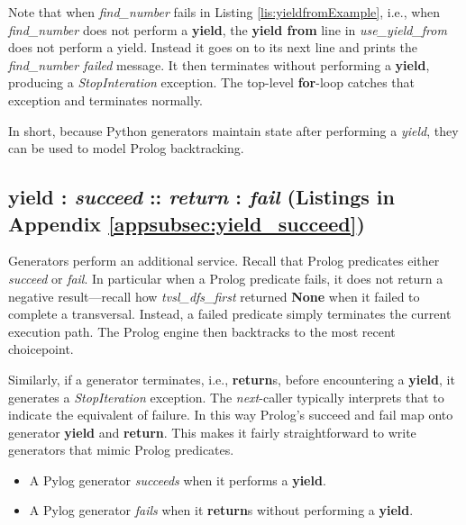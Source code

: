 
Note that when \textit{find\_number} fails in Listing \ref{lis:yieldfromExample}, i.e., when  \textit{find\_number} does not perform a \textbf{yield}, the \textbf{yield from} line in \textit{use\_yield\_from} does not perform a yield. Instead it goes on to its next line and prints the \textit{find\_number failed} message. It then terminates without performing a \textbf{yield}, producing a \textit{StopInteration} exception. The top-level \textbf{for}-loop catches that exception and terminates normally. 

In short, because Python generators maintain state after performing a \textit{yield}, they can be used to model Prolog backtracking.

\subsection{\textbf{yield} : \textit{succeed} :: \textit{return} : \textit{fail} (Listings in Appendix \ref{appsubsec:yield_succeed})} \label{subsec:yield_succeed}
Generators perform an additional service. Recall that Prolog predicates either \textit{succeed} or \textit{fail}. In particular when a Prolog predicate fails, it does not return a negative result---recall how \textit{tvsl\_dfs\_first} returned \textbf{None} when it failed to complete a transversal. Instead, a failed predicate simply terminates the current execution path. The Prolog engine then backtracks to the most recent choicepoint.

Similarly, if a generator terminates, i.e., \textbf{return}s, before encountering a \textbf{yield}, it generates a \textit{StopIteration} exception. The \textit{next}-caller typically interprets that to indicate the equivalent of failure. In this way Prolog's succeed and fail map onto generator \textbf{yield} and \textbf{return}. This makes it fairly straightforward to write generators that mimic Prolog predicates.

\begin{itemize}
    \item A Pylog generator \textit{succeeds} when it performs a \textbf{yield}. 
    \item A Pylog generator \textit{fails} when it \textbf{return}s without performing a \textbf{yield}. 
\end{itemize}

